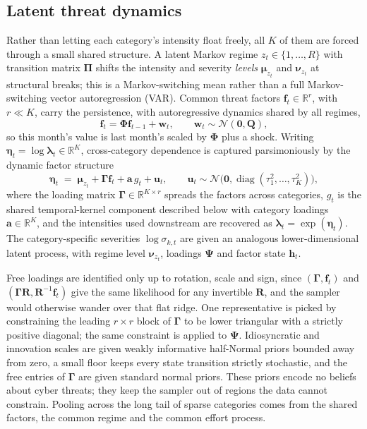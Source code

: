 \documentclass[review]{elsarticle}
\newcommand{\R}{\mathbb{R}}
\begin{document}
\subsection{Latent threat dynamics}

Rather than letting each category's intensity float freely, all $K$ of them are forced through a small shared structure. A latent Markov regime $z_t \in \{1, \dots, R\}$ with transition matrix $\bm{\Pi}$ shifts the intensity and severity \emph{levels} $\bm{\mu}_{z_t}$ and $\bm{\nu}_{z_t}$ at structural breaks; this is a Markov-switching mean rather than a full Markov-switching vector autoregression (VAR). Common threat factors $\bm{f}_t \in \R^{r}$, with $r \ll K$, carry the persistence, with autoregressive dynamics shared by all regimes,
\begin{equation}\label{eq:factordyn}
    \bm{f}_t = \bm{\Phi} \bm{f}_{t-1} + \bm{w}_t,
    \qquad \bm{w}_t \sim \mathcal{N}(\bm{0}, \bm{Q}),
\end{equation}
so this month's value is last month's scaled by $\bm{\Phi}$ plus a shock. Writing $\bm{\eta}_t = \log \bm{\lambda}_t \in \R^{K}$, cross-category dependence is captured parsimoniously by the dynamic factor structure
\begin{equation}\label{eq:factor}
    \bm{\eta}_t \;=\; \bm{\mu}_{z_t} + \bm{\Gamma} \bm{f}_t + \bm{a}\, g_t + \bm{u}_t,
    \qquad
    \bm{u}_t \sim \mathcal{N}\big(\bm{0}, \operatorname{diag}(\tau_1^2, \dots, \tau_K^2)\big),
\end{equation}
where the loading matrix $\bm{\Gamma} \in \R^{K \times r}$ spreads the factors across categories, $g_t$ is the shared temporal-kernel component described below with category loadings $\bm{a} \in \R^{K}$, and the intensities used downstream are recovered as $\bm{\lambda}_t = \exp(\bm{\eta}_t)$. The category-specific severities $\log \sigma_{k,t}$ are given an analogous lower-dimensional latent process, with regime level $\bm{\nu}_{z_t}$, loadings $\bm{\Psi}$ and factor state $\bm{h}_t$.

Free loadings are identified only up to rotation, scale and sign, since $(\bm{\Gamma}, \bm{f}_t)$ and $(\bm{\Gamma}\bm{R}, \bm{R}^{-1}\bm{f}_t)$ give the same likelihood for any invertible $\bm{R}$, and the sampler would otherwise wander over that flat ridge. One representative is picked by constraining the leading $r \times r$ block of $\bm{\Gamma}$ to be lower triangular with a strictly positive diagonal; the same constraint is applied to $\bm{\Psi}$. Idiosyncratic and innovation scales are given weakly informative half-Normal priors bounded away from zero, a small floor keeps every state transition strictly stochastic, and the free entries of $\bm{\Gamma}$ are given standard normal priors. These priors encode no beliefs about cyber threats; they keep the sampler out of regions the data cannot constrain. Pooling across the long tail of sparse categories comes from the shared factors, the common regime and the common effort process.
\end{document}
